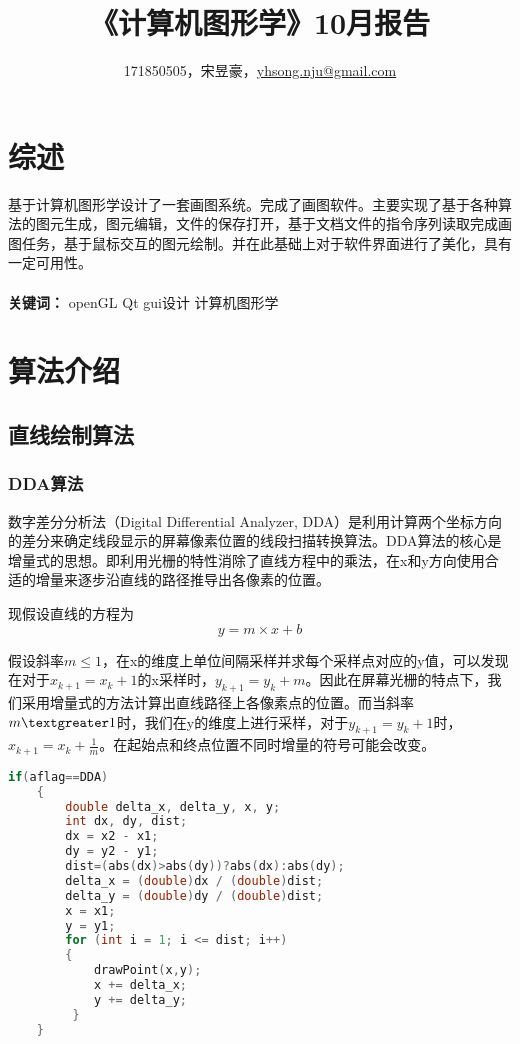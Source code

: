 \documentclass[a4paper,UTF8]{article}
\theoremstyle{definition}
\begin{document}
\title{\textbf{《计算机图形学》10月报告}}
\author{171850505，宋昱豪，\href{mailto:yhsong.nju@gmail.com}{yhsong.nju@gmail.com}}
\maketitle

\section{综述}
基于计算机图形学设计了一套画图系统。完成了画图软件。主要实现了基于各种算法的图元生成，图元编辑，文件的保存打开，基于文档文件的指令序列读取完成画图任务，基于鼠标交互的图元绘制。并在此基础上对于软件界面进行了美化，具有一定可用性。\\
\\ \textbf{关键词：} openGL \qquad  Qt gui设计 \qquad 计算机图形学
\section{算法介绍}
\subsection{直线绘制算法}
\subsubsection{DDA算法}
数字差分分析法（Digital Differential Analyzer, DDA）是利用计算两个坐标方向的差分来确定线段显示的屏幕像素位置的线段扫描转换算法。DDA算法的核心是增量式的思想。即利用光栅的特性消除了直线方程中的乘法，在x和y方向使用合适的增量来逐步沿直线的路径推导出各像素的位置。
\par 现假设直线的方程为
\begin{equation}
y=m\times x +b
\end{equation}
\par 假设斜率$m \leq 1$，在x的维度上单位间隔采样并求每个采样点对应的y值，可以发现在对于$x_{k+1}=x_{k}+1$的x采样时，$y_{k+1}=y_{k}+m$。因此在屏幕光栅的特点下，我们采用增量式的方法计算出直线路径上各像素点的位置。而当斜率$m \textgreater 1$时，我们在y的维度上进行采样，对于$y_{k+1}=y_{k}+1$时，$x_{k+1}=x_{k}+\frac {1}{m}$。在起始点和终点位置不同时增量的符号可能会改变。
\begin{lstlisting}[language={C++}]
 if(aflag==DDA)
    {
        double delta_x, delta_y, x, y;
        int dx, dy, dist;
        dx = x2 - x1;
        dy = y2 - y1;
        dist=(abs(dx)>abs(dy))?abs(dx):abs(dy);
        delta_x = (double)dx / (double)dist;
        delta_y = (double)dy / (double)dist;
        x = x1;
        y = y1;
        for (int i = 1; i <= dist; i++)
        {
            drawPoint(x,y);
            x += delta_x;
            y += delta_y;
         }
    }
\end{lstlisting}
\end{document}
